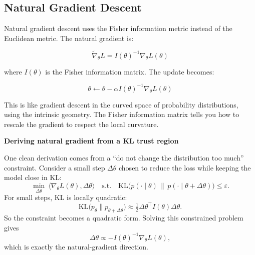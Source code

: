 \subsection{Natural Gradient Descent}

Natural gradient descent uses the Fisher information metric instead of the Euclidean metric. The natural gradient is:

\begin{equation}
\tilde{\nabla}_\theta L = I(\theta)^{-1} \nabla_\theta L(\theta)
\end{equation}

where $I(\theta)$ is the Fisher information matrix. The update becomes:

\begin{equation}
\theta \leftarrow \theta - \alpha I(\theta)^{-1} \nabla_\theta L(\theta)
\end{equation}

\vspace{1em}

This is like gradient descent in the curved space of probability distributions, using the intrinsic geometry. The Fisher information matrix tells you how to rescale the gradient to respect the local curvature.

\vspace{1em}

\begin{examplebox}
\textbf{Deriving natural gradient from a KL trust region}

\vspace{0.5em}

One clean derivation comes from a ``do not change the distribution too much'' constraint. Consider a small step $\Delta\theta$ chosen to reduce the loss while keeping the model close in KL:
\begin{equation*}
\min_{\Delta\theta}\ \langle \nabla_\theta L(\theta), \Delta\theta\rangle
\quad\text{s.t.}\quad
\text{KL}\big(p(\cdot\mid\theta)\,\|\,p(\cdot\mid\theta+\Delta\theta)\big)\le \varepsilon.
\end{equation*}
For small steps, KL is locally quadratic:
\begin{equation*}
\text{KL}\big(p_\theta\|p_{\theta+\Delta\theta}\big)\approx \tfrac{1}{2}\Delta\theta^\top I(\theta)\Delta\theta.
\end{equation*}
So the constraint becomes a quadratic form. Solving this constrained problem gives
\begin{equation*}
\Delta\theta \propto -I(\theta)^{-1}\nabla_\theta L(\theta),
\end{equation*}
which is exactly the natural-gradient direction.
\end{examplebox}

